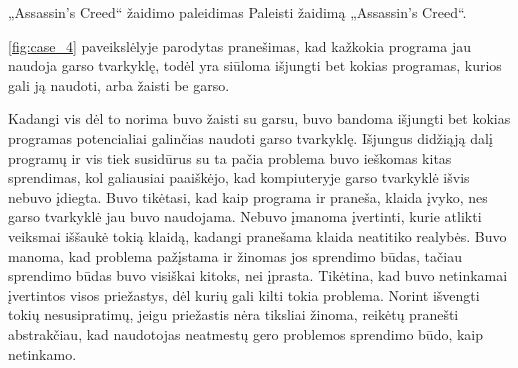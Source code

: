 ﻿\begin{xcase}{„Assassin's Creed“ žaidimo paleidimas}
  \xcgoal
  {
    Paleisti žaidimą „Assassin's Creed“.
  }
  \xctools
  {
    \ref{fig:case_4} paveikslėlyje parodytas pranešimas, kad kažkokia programa jau naudoja 
    garso tvarkyklę, todėl yra siūloma išjungti bet kokias programas, kurios gali ją naudoti, 
    arba žaisti be garso.

  }
  \xcresult
  {
    Kadangi vis dėl to norima buvo žaisti su garsu, buvo bandoma išjungti bet kokias programas 
    potencialiai galinčias naudoti garso tvarkyklę. Išjungus didžiąją dalį programų ir vis tiek 
    susidūrus su  ta pačia problema buvo ieškomas kitas sprendimas, kol galiausiai paaiškėjo, 
    kad kompiuteryje garso tvarkyklė išvis nebuvo įdiegta.
  }
  \xcprinciples
  {
    {
      Buvo tikėtasi, kad kaip programa ir praneša, klaida įvyko, nes garso tvarkyklė jau 
      buvo naudojama.
    }
    {
      Nebuvo įmanoma įvertinti, kurie atlikti veiksmai iššaukė tokią klaidą, kadangi pranešama 
      klaida neatitiko realybės.
    }
    {
      Buvo manoma, kad problema pažįstama ir žinomas jos sprendimo būdas, tačiau sprendimo 
      būdas buvo visiškai kitoks, nei įprasta.
    }
  }
  \xcthoughts
  {
    Tikėtina, kad buvo netinkamai įvertintos visos priežastys, dėl kurių gali kilti tokia 
    problema. Norint išvengti tokių nesusipratimų, jeigu priežastis nėra tiksliai žinoma, 
    reikėtų pranešti abstrakčiau, kad naudotojas neatmestų gero problemos sprendimo būdo, 
    kaip netinkamo.
  }
\end{xcase}

